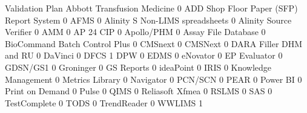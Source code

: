 \documentclass{article}
\begin{document}
\begin{Schunk}
\begin{Soutput}
                                           Validation Plan
  Abbott Transfusion Medicine                            0
  ADD Shop Floor Paper (SFP) Report System               0
  AFMS                                                   0
  Alinity S Non-LIMS spreadsheets                        0
  Alinity Source Verifier                                0
  AMM                                                    0
  AP 24 CIP                                              0
  Apollo/PHM                                             0
  Assay File Database                                    0
  BioCommand Batch Control Plus                          0
  CMSnext                                                0
  CMSNext                                                0
  DARA Filler DHM and RU                                 0
  DaVinci                                                0
  DFCS                                                   1
  DPW                                                    0
  EDMS                                                   0
  eNovator                                               0
  EP Evaluator                                           0
  GDSN/GS1                                               0
  Groninger                                              0
  GS Reports                                             0
  ideaPoint                                              0
  IRIS                                                   0
  Knowledge Management                                   0
  Metrics Library                                        0
  Navigator                                              0
  PCN/SCN                                                0
  PEAR                                                   0
  Power BI                                               0
  Print on Demand                                        0
  Pulse                                                  0
  QIMS                                                   0
  Reliasoft Xfmea                                        0
  RSLMS                                                  0
  SAS                                                    0
  TestComplete                                           0
  TODS                                                   0
  TrendReader                                            0
  WWLIMS                                                 1
\end{Soutput}
\end{Schunk}
\end{document}

